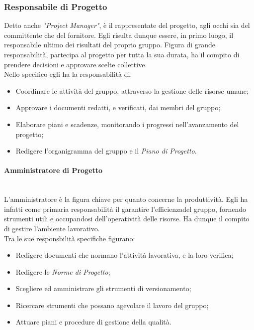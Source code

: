 \subsubsection{Responsabile di Progetto}
	Detto anche \textit{"Project Manager"}, è il rappresentate del progetto\glossario, agli occhi sia del committente che del 			fornitore. Egli risulta dunque essere, in primo luogo, il responsabile ultimo dei risultati del proprio gruppo. 			Figura di grande responsabilità, partecipa al progetto per tutta la sua durata, ha il compito di prendere 						decisioni 	e approvare scelte collettive.\\
	Nello specifico egli ha la responsabilità di:
	\begin{itemize}
	\item Coordinare le attività del gruppo, attraverso la gestione delle risorse umane;
	\item Approvare i documenti redatti, e verificati, dai membri del gruppo;
	\item Elaborare piani e scadenze, monitorando i progressi nell'avanzamento del progetto;
	\item Redigere l'organigramma del gruppo e il \textit{Piano di Progetto}\glossario.
	\end{itemize}

\paragraph{Amministratore di Progetto} ~\\
	L'amministratore è la figura chiave per quanto concerne la produttività. Egli ha infatti come primaria 							responsabilità il garantire l'efficienza\glossario del gruppo, fornendo strumenti utili e occupandosi 								dell'operatività delle risorse. Ha dunque il compito di gestire l'ambiente lavorativo.\\
	Tra le sue responsbilità specifiche figurano:
	\begin{itemize}
	\item Redigere documenti che normano l'attività lavorativa, e la loro verifica\glossario;
	\item Redigere le \textit{Norme di Progetto}\glossario;
	\item Scegliere ed amministrare gli strumenti di versionamento\glossario;
	\item Ricercare strumenti che possano agevolare il lavoro del gruppo;
	\item Attuare piani e procedure di gestione della qualità\glossario.
	\end{itemize}

